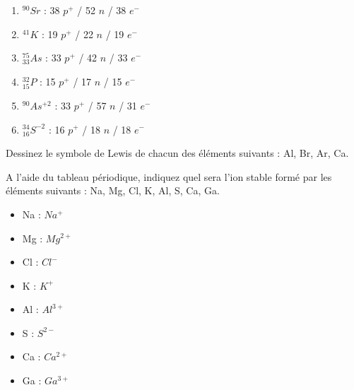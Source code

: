 \documentclass[
  11pt,
  french,
  a4paper,
  openany]{book}
\providecommand{\tightlist}{%
  \setlength{\itemsep}{0pt}\setlength{\parskip}{0pt}}
\begin{document}
\begin{Answer}

\begin{enumerate}
\def\labelenumi{\arabic{enumi}.}
\tightlist
\item
  \(^{90}Sr\) : 38 \(p^+\) / 52 \(n\) / 38 \(e^-\)
\item
  \(^{41}K\) : 19 \(p^+\) / 22 \(n\) / 19 \(e^-\)
\item
  \(^{75}_{33}As\) : 33 \(p^+\) / 42 \(n\) / 33 \(e^-\)
\item
  \(^{32}_{15}P\) : 15 \(p^+\) / 17 \(n\) / 15 \(e^-\)
\item
  \(^{90}As^{+2}\) : 33 \(p^+\) / 57 \(n\) / 31 \(e^-\)
\item
  \(^{34}_{16}S^{-2}\) : 16 \(p^+\) / 18 \(n\) / 18 \(e^-\)
\end{enumerate}


\end{Answer}

\begin{Exercise}

Dessinez le symbole de Lewis de chacun des éléments suivants : Al, Br, Ar, Ca.



\end{Exercise}

\begin{Exercise}

A l'aide du tableau périodique, indiquez quel sera l'ion stable formé par les éléments suivants : Na, Mg, Cl, K, Al, S, Ca, Ga.



\end{Exercise}

\begin{Answer}

\begin{itemize}
\tightlist
\item
  Na : \(Na^+\)
\item
  Mg : \(Mg^{2+}\)
\item
  Cl : \(Cl^-\)
\item
  K : \(K^+\)
\item
  Al : \(Al^{3+}\)
\item
  S : \(S^{2-}\)
\item
  Ca : \(Ca^{2+}\)
\item
  Ga : \(Ga^{3+}\)
\end{itemize}


\end{Answer}
\end{document}
